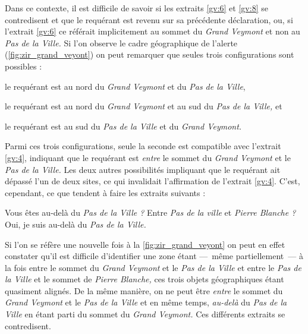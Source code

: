 Dans ce contexte, il est difficile de savoir si les extraits
\ref{gv:6} et \ref{gv:8} se contredisent et que le requérant est
revenu sur sa précédente déclaration, ou, si l'extrait \ref{gv:6} ce
référait implicitement au sommet du \emph{Grand Veymont} et non au
\emph{Pas de la Ville.} Si l'on observe le cadre géographique de
l'alerte (\autoref{fig:zir_grand_veyont}) on peut remarquer que seules
trois configurations sont possibles :
%
\begin{enumerate*}[label=(\arabic*)]
\item le requérant est au nord du \emph{Grand Veymont} et du \emph{Pas
    de la Ville},
\item le requérant est au nord du \emph{Grand Veymont} et au sud du
  \emph{Pas de la Ville,} et
\item le requérant est au sud du \emph{Pas de la Ville} et du
  \emph{Grand Veymont.}
\end{enumerate*}
%
Parmi ces trois configurations, seule la seconde est compatible avec
l'extrait \ref{gv:4}, indiquant que le requérant est \emph{entre} le
sommet du \emph{Grand Veymont} et le \emph{Pas de la Ville.} Les deux
autres possibilités impliquant que le requérant ait dépassé l'un de
deux sites, ce qui invalidait l'affirmation de l'extrait
\ref{gv:4}. C'est, cependant, ce que tendent à faire les extraits
suivants :
%
\begin{dialogue*}
  \Sec {} Vous êtes au-delà du \emph{Pas de la Ville ?}
   Entre \emph{Pas de la ville} et \emph{Pierre
    Blanche ?}
  \Req {} Oui, je suis au-delà du \emph{Pas de la
    Ville.}
\end{dialogue*}

Si l'on se réfère une nouvelle fois à la
\autoref{fig:zir_grand_veyont} on peut en effet constater qu'il est
difficile d'identifier une zone étant ---~même partiellement~--- à la
fois entre le sommet du \emph{Grand Veymont} et le \emph{Pas de la
  Ville} et entre le \emph{Pas de la Ville} et le sommet de
\emph{Pierre Blanche,} ces trois objets géographiques étant quasiment
alignés. De la même manière, on ne peut être \emph{entre} le sommet du
\emph{Grand Veymont} et le \emph{Pas de la Ville} et en même temps,
\emph{au-delà} du \emph{Pas de la Ville} en étant parti du sommet du
\emph{Grand Veymont.} Ces différents extraits se contredisent.

